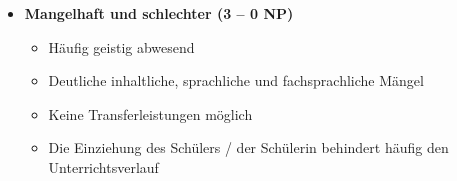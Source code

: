 {\begin{multicols}{2}
\begin{itemize}[label={}]
\item \textbf{Mangelhaft und schlechter (3 – 0 NP)}
\begin{itemize}
	\item Häufig geistig abwesend
	\item Deutliche inhaltliche, sprachliche und fachsprachliche Mängel
	\item Keine Transferleistungen möglich
	\item Die Einziehung des Schülers / der Schülerin behindert häufig den Unterrichtsverlauf
\end{itemize}
\end{itemize}

\end{multicols}
}